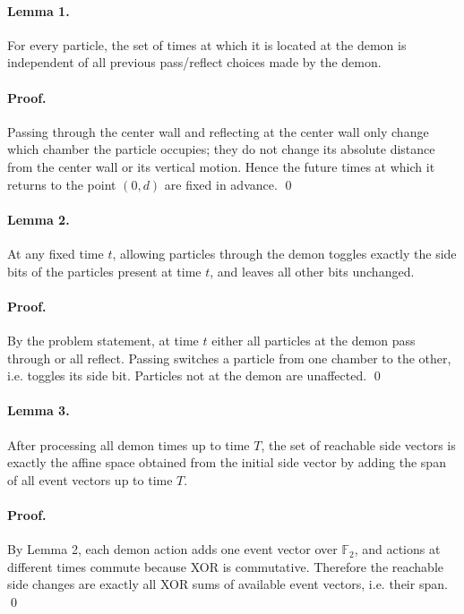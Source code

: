 \documentclass[11pt]{article}
\begin{document}
\paragraph{Lemma 1.}
For every particle, the set of times at which it is located at the demon is independent of all previous pass/reflect choices made by the demon.

\paragraph{Proof.}
Passing through the center wall and reflecting at the center wall only change which chamber the particle occupies; they do not change its absolute distance from the center wall or its vertical motion. Hence the future times at which it returns to the point $(0,d)$ are fixed in advance. \qed

\paragraph{Lemma 2.}
At any fixed time $t$, allowing particles through the demon toggles exactly the side bits of the particles present at time $t$, and leaves all other bits unchanged.

\paragraph{Proof.}
By the problem statement, at time $t$ either all particles at the demon pass through or all reflect. Passing switches a particle from one chamber to the other, i.e. toggles its side bit. Particles not at the demon are unaffected. \qed

\paragraph{Lemma 3.}
After processing all demon times up to time $T$, the set of reachable side vectors is exactly the affine space obtained from the initial side vector by adding the span of all event vectors up to time $T$.

\paragraph{Proof.}
By Lemma 2, each demon action adds one event vector over $\mathbb{F}_2$, and actions at different times commute because XOR is commutative. Therefore the reachable side changes are exactly all XOR sums of available event vectors, i.e. their span. \qed
\end{document}
